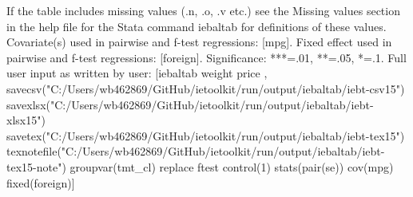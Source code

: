 If the table includes missing values (.n, .o, .v etc.) see the Missing values section in the help file for the Stata command iebaltab for definitions of these values. Covariate(s) used in pairwise and f-test regressions: [mpg]. Fixed effect used in pairwise and f-test regressions: [foreign]. Significance: ***=.01, **=.05, *=.1. Full user input as written by user: [iebaltab weight price , savecsv("C:/Users/wb462869/GitHub/ietoolkit/run/output/iebaltab/iebt-csv15") savexlsx("C:/Users/wb462869/GitHub/ietoolkit/run/output/iebaltab/iebt-xlsx15") savetex("C:/Users/wb462869/GitHub/ietoolkit/run/output/iebaltab/iebt-tex15") texnotefile("C:/Users/wb462869/GitHub/ietoolkit/run/output/iebaltab/iebt-tex15-note") groupvar(tmt\_cl) replace ftest control(1) stats(pair(se)) cov(mpg) fixed(foreign)] 
